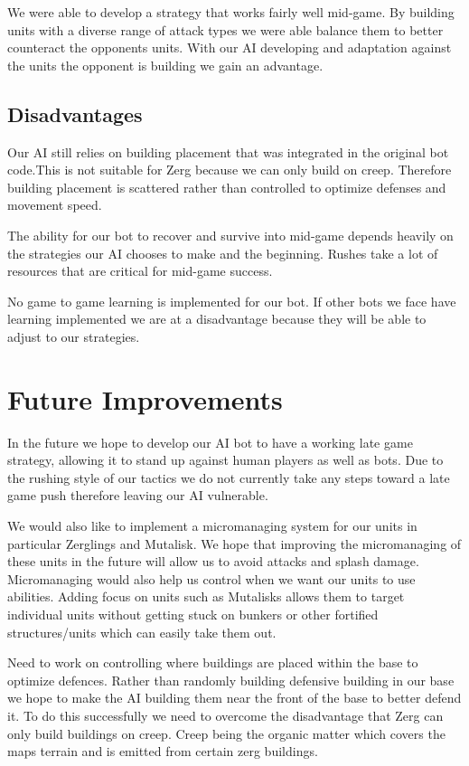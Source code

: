 \documentclass{article}
\begin{document}
We were able to develop a strategy that works fairly well mid-game. By building units with a diverse range of attack types we were able balance them to better counteract the opponents units. With our AI developing and adaptation against the units the opponent is building we gain an advantage.

\subsection{Disadvantages}
Our AI still relies on building placement that was integrated in the original bot code.This is not suitable for Zerg because we can only build on creep. Therefore building placement is scattered rather than controlled to optimize defenses and movement speed.

The ability for our bot to recover and survive into mid-game depends heavily on the strategies our AI chooses to make and the beginning. Rushes take a lot of resources that are critical for mid-game success.

No game to game learning is implemented for our bot. If other bots we face have learning implemented we are at a disadvantage because they will be able to adjust to our strategies.

\section{Future Improvements}

In the future we hope to develop our AI bot to have a working late game strategy, allowing it to stand up against human players as well as bots. Due to the rushing style of our tactics we do not currently take any steps toward a late game push therefore leaving our AI vulnerable. 

We would also like to implement a micromanaging system for our units in particular Zerglings and Mutalisk. We hope that improving the micromanaging of these units in the future will allow us to avoid attacks and splash damage. Micromanaging would also help us control when we want our units to use abilities. Adding focus on units such as Mutalisks allows them to target individual units without getting stuck on bunkers or other fortified structures/units which can easily take them out.

Need to work on controlling where buildings are placed within the base to optimize defences. Rather than randomly building defensive building in our base we hope to make the AI building them near the front of the base to better defend it. To do this successfully we need to overcome the disadvantage that Zerg can only build buildings on creep. Creep being the organic matter which covers the maps terrain and is emitted from certain zerg buildings.
\end{document}
